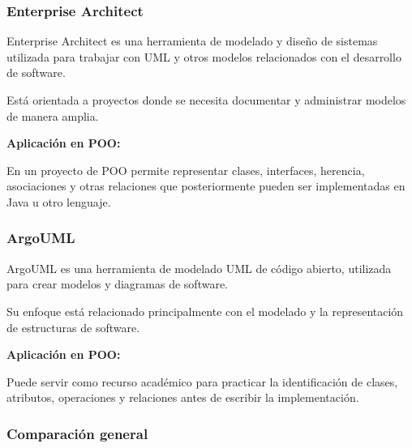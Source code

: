 \documentclass[12pt,a4paper]{article}
\begin{document}
\subsubsection{Enterprise Architect}

Enterprise Architect es una herramienta de modelado y diseño de
sistemas utilizada para trabajar con UML y otros modelos
relacionados con el desarrollo de software.

Está orientada a proyectos donde se necesita documentar y administrar
modelos de manera amplia.

\textbf{Aplicación en POO:}

En un proyecto de POO permite representar clases, interfaces,
herencia, asociaciones y otras relaciones que posteriormente pueden
ser implementadas en Java u otro lenguaje.

\subsubsection{ArgoUML}

ArgoUML es una herramienta de modelado UML de código abierto,
utilizada para crear modelos y diagramas de software.

Su enfoque está relacionado principalmente con el modelado y la
representación de estructuras de software.

\textbf{Aplicación en POO:}

Puede servir como recurso académico para practicar la identificación
de clases, atributos, operaciones y relaciones antes de escribir la
implementación.


\subsubsection{Comparación general}
\end{document}
